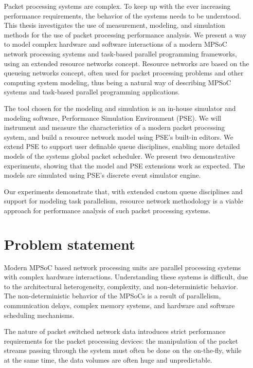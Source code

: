 Packet processing systems are complex. To keep up with the ever increasing performance requirements, the behavior of the systems needs to be understood. This thesis investigates the use of measurement, modeling, and simulation methods for the use of packet processing performance analysis. We present a way to model complex hardware and software interactions of a modern MPSoC network processing systems and task-based parallel programming frameworks, using an extended resource networks concept. Resource networks are based on the queueing networks concept, often used for packet processing problems and other computing system modeling, thus being a natural way of describing MPSoC systems and task-based parallel programming applications.

The tool chosen for the modeling and simulation is an in-house simulator and modeling software, Performance Simulation Environment (PSE). We will instrument and measure the characteristics of a modern packet processing system, and build a resource network model using PSE's built-in editors. We extend PSE to support user definable queue disciplines, enabling more detailed models of the systems global packet scheduler. We present two demonstrative experiments, showing that the model and PSE extensions work as expected. The models are simulated using PSE's discrete event simulator engine.

Our experiments demonstrate that, with extended custom queue disciplines and support for modeling task parallelism, resource network methodology is a viable approach for performance analysis of such packet processing systems.

\section{Problem statement}
Modern MPSoC based network processing units are parallel processing systems with complex hardware interactions. Understanding these systems is difficult, due to the architectural heterogeneity, complexity, and non-deterministic behavior. The non-deterministic behavior of the MPSoCs is a result of parallelism, communication delays, complex memory systems, and hardware and software scheduling mechanisms.

The nature of packet switched network data introduces strict performance requirements for the packet processing devices: the manipulation of the packet streams passing through the system must often be done on the on-the-fly, while at the same time, the data volumes are often huge and unpredictable.

